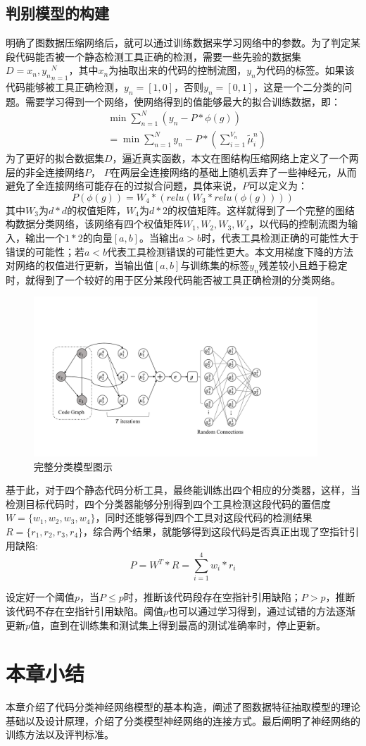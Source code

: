 \subsection{判别模型的构建}
明确了图数据压缩网络后，就可以通过训练数据来学习网络中的参数。为了判定某段代码能否被一个静态检测工具正确的检测，需要一些先验的数据集 $D={x_n, y_n}_{n=1}^N$，其中$x_n$为抽取出来的代码的控制流图，$y_n$为代码的标签。如果该代码能够被工具正确检测，$y_n=[1, 0]$，否则$y_n=[0, 1]$，这是一个二分类的问题。需要学习得到一个网络，使网络得到的值能够最大的拟合训练数据，即：
\begin{align}
&\min \sum_{n=1}^{N} (y_n - P*\phi(g))\\
&=\min \sum_{n=1}^{N} y_n - P*(\sum_{i=1}^{V_n} \tilde{\mu}_i^n)
\end{align}
为了更好的拟合数据集$D$，逼近真实函数，本文在图结构压缩网络上定义了一个两层的非全连接网络$P$， $P$在两层全连接网络的基础上随机丢弃了一些神经元，从而避免了全连接网络可能存在的过拟合问题，具体来说，$P$可以定义为：
\begin{equation}
P(\phi(g)) = W_4*(relu(W_3*relu(\phi(g))))
\end{equation}
其中$W_3$为$d*d$的权值矩阵，$W_4$为$d*2$的权值矩阵。这样就得到了一个完整的图结构数据分类网络，该网络有四个权值矩阵$W_1, W_2, W_3, W_4$，以代码的控制流图为输入，输出一个$1*2$的向量$[a, b]$。当输出$a>b$时，代表工具检测正确的可能性大于错误的可能性；若$a<b$代表工具检测错误的可能性更大。本文用梯度下降的方法对网络的权值进行更新，当输出值$[a, b]$与训练集的标签$y_n$残差较小且趋于稳定时，就得到了一个较好的用于区分某段代码能否被工具正确检测的分类网络。
\begin{figure}[htbp]
	\begin{center}
		\includegraphics[width=0.95\textwidth]{figures//6.pdf}
		\caption{完整分类模型图示}
		\label{default}
	\end{center}
\end{figure}
\par 基于此，对于四个静态代码分析工具，最终能训练出四个相应的分类器，这样，当检测目标代码时，四个分类器能够分别得到四个工具检测这段代码的置信度$W = \{w_1, w_2, w_3, w_4\}$，同时还能够得到四个工具对这段代码的检测结果$R = \{r_1, r_2, r_3, r_4\}$，综合两个结果，就能够得到这段代码是否真正出现了空指针引用缺陷:
$$P = W^T*R = \sum_{i=1}^4 w_i*r_i$$
\par 设定好一个阈值$p$，当$P\le p$时，推断该代码段存在空指针引用缺陷；$P>p$，推断该代码不存在空指针引用缺陷。阈值$p$也可以通过学习得到，通过试错的方法逐渐更新$p$值，直到在训练集和测试集上得到最高的测试准确率时，停止更新。
\section{本章小结}
本章介绍了代码分类神经网络模型的基本构造，阐述了图数据特征抽取模型的理论基础以及设计原理，介绍了分类模型神经网络的连接方式。最后阐明了神经网络的训练方法以及评判标准。